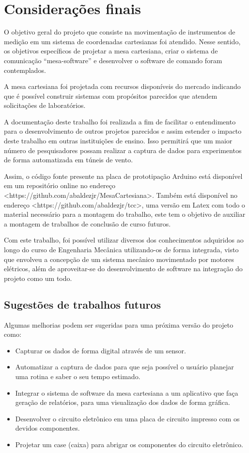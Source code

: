 \chapter{Considerações finais}
\label{chap:conclusao}

O objetivo geral do projeto que consiste na movimentação de instrumentos de medição em um sistema 
de coordenadas cartesianas foi atendido. Nesse sentido, os objetivos específicos de projetar a 
mesa cartesiana, criar o sistema de comunicação “mesa-software” e desenvolver o software 
de comando foram contemplados.

A mesa cartesiana foi projetada com recursos disponíveis do mercado indicando que é possível 
construir sistemas com propósitos parecidos que atendem solicitações de laboratórios.

A documentação deste trabalho foi realizada a fim de facilitar o entendimento 
para o desenvolvimento de outros projetos parecidos e assim estender o impacto deste 
trabalho em outras instituições de ensino. Isso permitirá que um maior número de pesquisadores 
possam realizar a captura de dados para experimentos de forma automatizada em túneis de vento. 

Assim, o código fonte presente na placa de prototipação Arduino está disponível 
em um repositório online no endereço <https://github.com/abaldezjr/MesaCartesiana>. 
Também está disponível no endereço <https://github.com/abaldezjr/tcc>, uma versão em Latex com todo o 
material necessário para a montagem do trabalho, este tem o objetivo de auxiliar a montagem de 
trabalhos de conclusão de curso futuros.

Com este trabalho, foi possível utilizar diversos dos conhecimentos adquiridos ao longo do curso de 
Engenharia Mecânica utilizando-os de forma integrada, visto que envolveu a concepção de um sistema 
mecânico movimentado por motores elétricos, além de aproveitar-se do desenvolvimento de software 
na integração do projeto como um todo.

\section{Sugestões de trabalhos futuros}\label{sec:criticas}

Algumas melhorias podem ser sugeridas para uma próxima versão do projeto como:

\begin{itemize}
    \item Capturar os dados de forma digital através de um sensor.
    \item Automatizar a captura de dados para que seja possível o usuário planejar uma rotina e saber o seu tempo estimado.
    \item Integrar o sistema de software da mesa cartesiana a um aplicativo que faça geração de relatórios, para uma visualização dos dados de forma gráfica.
    \item Desenvolver o circuito eletrônico em uma placa de circuito impresso com os devidos componentes.
    \item Projetar um case (caixa) para abrigar os componentes do circuito eletrônico.
\end{itemize}